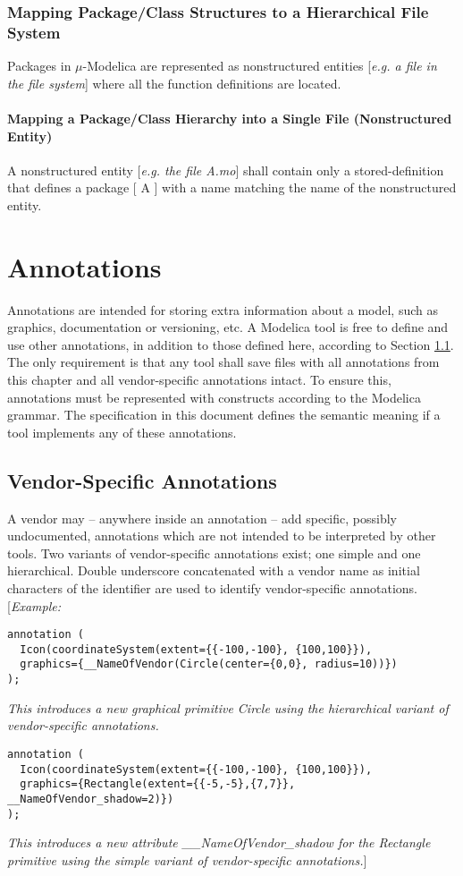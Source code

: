 \documentclass[11pt,a4paper,notitlepage]{report}
\begin{document}
\subsection{Mapping Package/Class Structures to a Hierarchical File System}

Packages in $\mu$-Modelica are represented as nonstructured entities [\emph{e.g. a file in the file system}] where all the function definitions are located. 

\subsubsection{Mapping a Package/Class Hierarchy into a Single File (Nonstructured Entity)}

A nonstructured entity [\emph{e.g. the file A.mo}] shall contain only a stored-definition that defines a package [ A ] with a name matching the name of the nonstructured entity.

\chapter{Annotations}\label{ch:annotations}

Annotations are intended for storing extra information about a model, such as graphics, documentation or versioning, etc. A Modelica tool is free to define and use other annotations, in addition to those defined here, according to Section \ref{annotations:specific}. The only requirement is that any tool shall save files with all annotations from this chapter and all vendor-specific annotations intact. To ensure this, annotations must be represented with constructs according to the Modelica grammar. The specification in this document defines the semantic meaning if a tool implements any of these annotations.

\section{Vendor-Specific Annotations}\label{annotations:specific}

A vendor may – anywhere inside an annotation – add specific, possibly undocumented, annotations which are not intended to be interpreted by other tools. Two variants of vendor-specific annotations exist; one simple and one hierarchical. Double underscore concatenated with a vendor name as initial characters of the identifier are used to identify vendor-specific annotations.
[\emph{Example:}
\begin{verbatim}
annotation (
  Icon(coordinateSystem(extent={{-100,-100}, {100,100}}),
  graphics={__NameOfVendor(Circle(center={0,0}, radius=10))})
);
\end{verbatim}
\emph{This introduces a new graphical primitive Circle using the hierarchical variant of vendor-specific annotations.}
\begin{verbatim}
annotation (
  Icon(coordinateSystem(extent={{-100,-100}, {100,100}}),
  graphics={Rectangle(extent={{-5,-5},{7,7}}, __NameOfVendor_shadow=2)})
);
\end{verbatim}
\emph{This introduces a new attribute __NameOfVendor_shadow for the Rectangle primitive using the simple variant of vendor-specific annotations.}]
\end{document}
